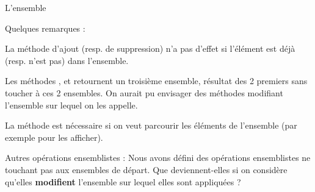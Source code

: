 \begin{Exercice}{L'ensemble}
	\bigskip

	Quelques remarques :
	\begin{liste}
		\item 
			La méthode d'ajout (resp. de suppression) n'a
			pas d'effet si l'élément est déjà
			(resp. n'est pas) dans l'ensemble.
		\item 
			Les méthodes , 
			 et 
			 retournent un troisième ensemble, 
			résultat des 2 premiers sans toucher
			à ces 2 ensembles. On aurait pu envisager des méthodes modifiant
			l'ensemble sur lequel on les appelle.
		\item 
			La méthode 
			est nécessaire si on veut parcourir les éléments de
			l'ensemble (par exemple pour les afficher).
	\end{liste}
	
	Autres opérations ensemblistes :
	Nous avons défini des opérations ensemblistes ne touchant pas aux
	ensembles de départ. Que deviennent-elles si on considère
	qu'elles \textbf{modifient}
	l'ensemble sur lequel elles sont appliquées ?
\end{Exercice}

